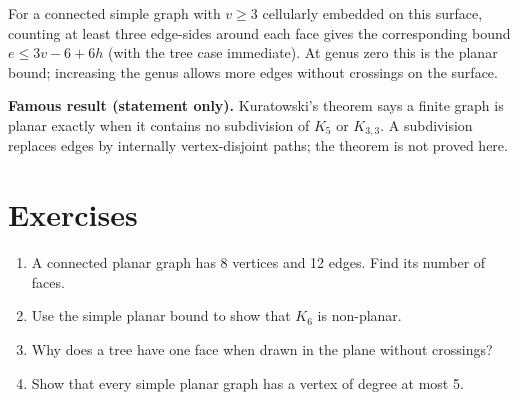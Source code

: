 For a connected simple graph with $v\geq 3$ cellularly embedded on this surface, counting at least three edge-sides around each face gives the corresponding bound $e\leq 3v-6+6h$ (with the tree case immediate). At genus zero this is the planar bound; increasing the genus allows more edges without crossings on the surface.

\textbf{Famous result (statement only).} Kuratowski's theorem says a finite graph is planar exactly when it contains no subdivision of $K_5$ or $K_{3,3}$. A subdivision replaces edges by internally vertex-disjoint paths; the theorem is not proved here.

\section*{Exercises}
\begin{enumerate}
\item A connected planar graph has 8 vertices and 12 edges. Find its number of faces.
\item Use the simple planar bound to show that $K_6$ is non-planar.
\item Why does a tree have one face when drawn in the plane without crossings?
\item \Challenge{} Show that every simple planar graph has a vertex of degree at most 5.
\end{enumerate}
